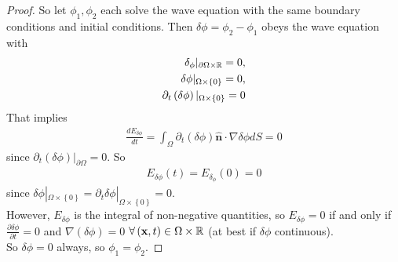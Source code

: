 \documentclass[a4paper]{article}
\begin{document}
\begin{proof}
So let $\phi_1,\phi_2$ each solve the wave equation with the same boundary conditions and initial conditions. Then $\delta\phi = \phi_2 - \phi_1$ obeys the wave equation with
\begin{equation*}
\begin{aligned}
\delta_\phi|_{\partial \Omega \times \mathbb{R}} = 0,\\
\delta\phi|_{\Omega\times\left\{0\right\}} = 0,\\
\partial_t \left(\delta\phi\right)|_{\Omega \times \left\{0\right\}} = 0
\end{aligned}
\end{equation*}
That implies 
\begin{equation*}
\begin{aligned}
\frac{dE_{\delta\phi}}{dt} = \int_\Omega \partial_t \left(\delta\phi\right) \mathbf{\hat{n}}\cdot\nabla\delta\phi dS = 0
\end{aligned}
\end{equation*}
since $\partial_t \left(\delta \phi\right)|_{\partial \Omega} = 0$. So
\begin{equation*}
\begin{aligned}
E_{\delta\phi}\left(t\right) = E_{\delta_\phi}\left(0\right) = 0
\end{aligned}
\end{equation*}
since $\delta\phi|_{\Omega\times\left\{0\right\}} = \partial_t \delta\phi|_{\Omega\times\left\{0\right\}} = 0$.\\
However, $E_{\delta\phi}$ is the integral of non-negative quantities, so $E_{\delta\phi} = 0$ if and only if $\frac{\partial\delta\phi}{\partial t} = 0$ and $\nabla\left(\delta\phi\right) = 0$ $\forall \left(\mathbf{x},t\right) \in \Omega\times \mathbb{R}$ (at best if $\delta \phi$ continuous).\\
So $\delta\phi = 0$ always, so $\phi_1 = \phi_2$.
\end{proof}
\end{document}
